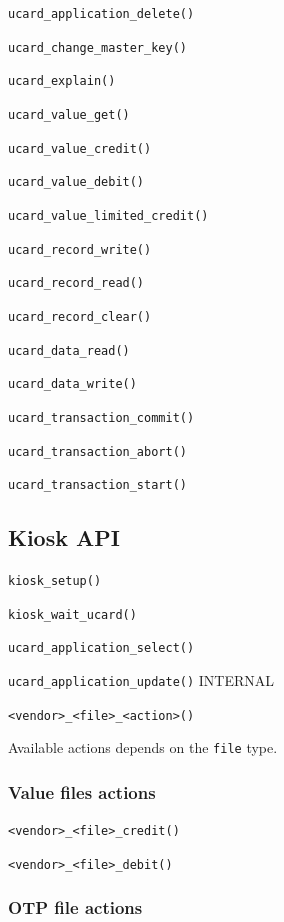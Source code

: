 \documentclass{article}
\begin{document}

\texttt{ucard\_application\_delete()}

\texttt{ucard\_change\_master\_key()}

\texttt{ucard\_explain()}


\texttt{ucard\_value\_get()}

\texttt{ucard\_value\_credit()}

\texttt{ucard\_value\_debit()}

\texttt{ucard\_value\_limited\_credit()}

\texttt{ucard\_record\_write()}

\texttt{ucard\_record\_read()}

\texttt{ucard\_record\_clear()}

\texttt{ucard\_data\_read()}

\texttt{ucard\_data\_write()}

\texttt{ucard\_transaction\_commit()}

\texttt{ucard\_transaction\_abort()}

\texttt{ucard\_transaction\_start()}

\subsection{Kiosk API}

\texttt{kiosk\_setup()}

\texttt{kiosk\_wait\_ucard()}

\texttt{ucard\_application\_select()}

\texttt{ucard\_application\_update()} INTERNAL


\texttt{<vendor>\_<file>\_<action>()}

Available actions depends on the \texttt{file} type.

\subsubsection{Value files actions}

\texttt{<vendor>\_<file>\_credit()}

\texttt{<vendor>\_<file>\_debit()}

\subsubsection{OTP file actions}
\end{document}

